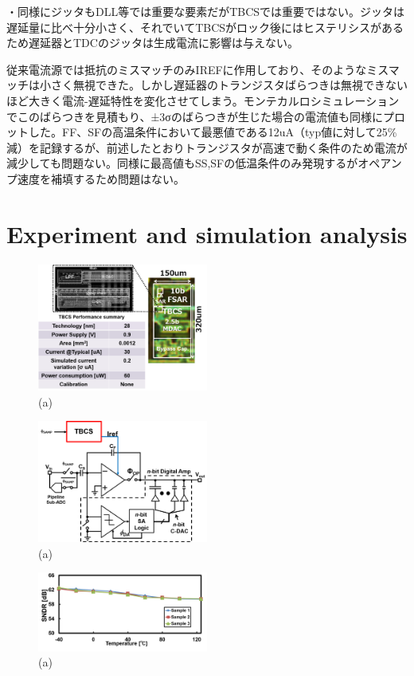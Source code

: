 \documentclass[letterpaper, 10 pt, conference]{ieeeconf}  %
\begin{document}
・同様にジッタもDLL等では重要な要素だがTBCSでは重要ではない。ジッタは遅延量に比べ十分小さく、それでいてTBCSがロック後にはヒステリシスがあるため遅延器とTDCのジッタは生成電流に影響は与えない。

従来電流源では抵抗のミスマッチのみIREFに作用しており、そのようなミスマッチは小さく無視できた。しかし遅延器のトランジスタばらつきは無視できないほど大きく電流-遅延特性を変化させてしまう。モンテカルロシミュレーションでこのばらつきを見積もり、±3σのばらつきが生じた場合の電流値も同様にプロットした。FF、SFの高温条件において最悪値である12uA（typ値に対して25\%減）を記録するが、前述したとおりトランジスタが高速で動く条件のため電流が減少しても問題ない。同様に最高値もSS,SFの低温条件のみ発現するがオペアンプ速度を補填するため問題はない。

\section{Experiment and simulation analysis}
\begin{figure}[!]
\centering
 \includegraphics[width=0.5\textwidth]{figs/chip.png}
  \caption{(a) 
}
\label{chip}
\end{figure}

\begin{figure}[!]
\centering
 \includegraphics[width=0.5\textwidth]{figs/switchcap.png}
  \caption{(a) 
}
\label{scap}
\end{figure}

\begin{figure}[!]
\centering
 \includegraphics[width=0.5\textwidth]{figs/sndr.png}
  \caption{(a) 
}
\label{sndr}
\end{figure}
\end{document}

